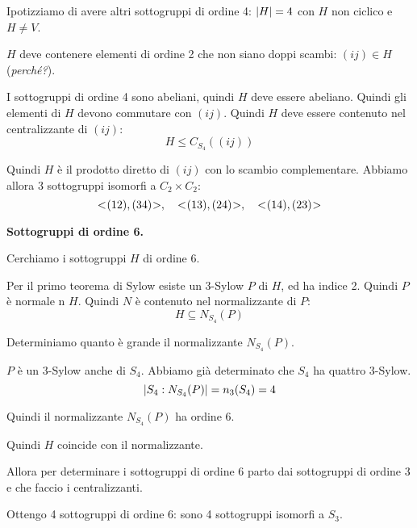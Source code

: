 \begin{soluzione}
    Ipotizziamo di avere altri sottogruppi di ordine 4: $\lvert H \rvert = 4$ con $H$ non ciclico e $H \ne V$.

    $H$ deve contenere elementi di ordine 2 che non siano doppi scambi: $(ij) \in H$ (\emph{perché?}).

    I sottogruppi di ordine 4 sono abeliani, quindi $H$ deve essere abeliano.
    Quindi gli elementi di $H$ devono commutare con $(ij)$.
    Quindi $H$ deve essere contenuto nel centralizzante di $(ij)$:
    \begin{equation*}
        H \le C_{S_4}((ij))
    \end{equation*}

    Quindi $H$ è il prodotto diretto di $(ij)$ con lo scambio complementare.
    Abbiamo allora 3 sottogruppi isomorfi a $C_2 \times C_2$:
    \begin{equation*}
        < \negmedspace (12),(34) \negmedspace >, \quad < \negmedspace (13),(24) \negmedspace >, \quad < \negmedspace (14),(23) \negmedspace >
    \end{equation*}

    \bigskip
    \textbf{Sottogruppi di ordine 6.}

    Cerchiamo i sottogruppi $H$ di ordine 6.

    Per il primo teorema di Sylow esiste un 3-Sylow $P$ di $H$, ed ha indice 2.
    Quindi $P$ è normale n $H$.
    Quindi $N$ è contenuto nel normalizzante di $P$:
    \begin{equation*}
        H \subseteq N_{S_4}(P)
    \end{equation*}

    Determiniamo quanto è grande il normalizzante $N_{S_4}(P)$.

    $P$ è un 3-Sylow anche di $S_4$.
    Abbiamo già determinato che $S_4$ ha quattro 3-Sylow.
    \begin{equation*}
        \lvert S_4:N_{S_4}(P) \rvert = n_3(S_4) = 4
    \end{equation*}

    Quindi il normalizzante $N_{S_4}(P)$ ha ordine 6.

    Quindi $H$ coincide con il normalizzante.

    Allora per determinare i sottogruppi di ordine 6 parto dai sottogruppi di ordine 3 e che faccio i centralizzanti.

    Ottengo 4 sottogruppi di ordine 6: sono 4 sottogruppi isomorfi a $S_3$.
\end{soluzione}
